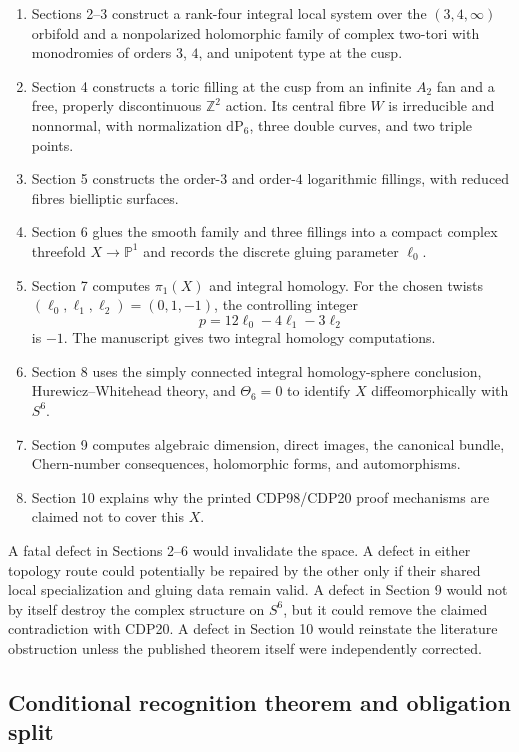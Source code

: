 \documentclass[
  10pt,
  letterpaper,
]{article}
\providecommand{\tightlist}{%
  \setlength{\itemsep}{0pt}\setlength{\parskip}{0pt}}
\newcommand{\Z}{\mathbb Z}
\newcommand{\Pone}{\mathbb P^1}
\newcommand{\dP}{\mathrm{dP}}
\begin{document}
\begin{enumerate}
\def\labelenumi{\arabic{enumi}.}
\tightlist
\item
  Sections 2--3 construct a rank-four integral local system over the
  \((3,4,\infty)\) orbifold and a nonpolarized holomorphic family of
  complex two-tori with monodromies of orders \(3\), \(4\), and
  unipotent type at the cusp.
\item
  Section 4 constructs a toric filling at the cusp from an infinite
  \(A_2\) fan and a free, properly discontinuous \(\Z^2\) action. Its
  central fibre \(W\) is irreducible and nonnormal, with normalization
  \(\dP_6\), three double curves, and two triple points.
\item
  Section 5 constructs the order-\(3\) and order-\(4\) logarithmic
  fillings, with reduced fibres bielliptic surfaces.
\item
  Section 6 glues the smooth family and three fillings into a compact
  complex threefold \(X\to\Pone\) and records the discrete gluing
  parameter \(\ell_0\).
\item
  Section 7 computes \(\pi_1(X)\) and integral homology. For the chosen
  twists \((\ell_0,\ell_1,\ell_2)=(0,1,-1)\), the controlling integer \[
  p=12\ell_0-4\ell_1-3\ell_2
  \] is \(-1\). The manuscript gives two integral homology computations.
\item
  Section 8 uses the simply connected integral homology-sphere
  conclusion, Hurewicz--Whitehead theory, and \(\Theta_6=0\) to identify
  \(X\) diffeomorphically with \(S^6\).
\item
  Section 9 computes algebraic dimension, direct images, the canonical
  bundle, Chern-number consequences, holomorphic forms, and
  automorphisms.
\item
  Section 10 explains why the printed CDP98/CDP20 proof mechanisms are
  claimed not to cover this \(X\).
\end{enumerate}

A fatal defect in Sections 2--6 would invalidate the space. A defect in
either topology route could potentially be repaired by the other only if
their shared local specialization and gluing data remain valid. A defect
in Section 9 would not by itself destroy the complex structure on
\(S^6\), but it could remove the claimed contradiction with CDP20. A
defect in Section 10 would reinstate the literature obstruction unless
the published theorem itself were independently corrected.

\subsection{Conditional recognition theorem and obligation
split}\label{conditional-recognition-theorem-and-obligation-split}
\end{document}
